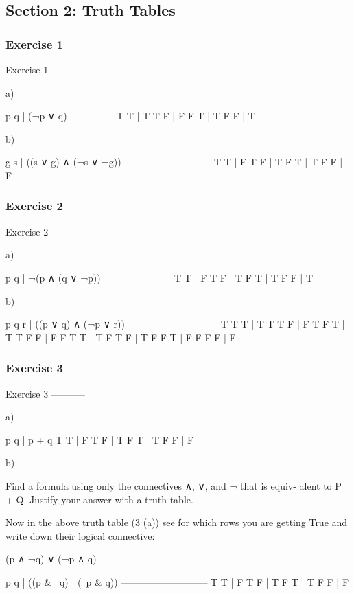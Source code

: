 \subsection{Section 2: Truth Tables}


\subsubsection{Exercise 1}
Exercise 1
-----------

a)


    p q | (¬p ∨ q)
    --------------
    T T | T
    T F | F
    F T | T
    F F | T


b)

    g s | ((s ∨ g) ∧ (¬s ∨ ¬g))
    ---------------------------
    T T | F
    T F | T
    F T | T
    F F | F

\subsubsection{Exercise 2}
Exercise 2
-----------

a)

    p q | ¬(p ∧ (q ∨ ¬p))
    ---------------------
    T T | F
    T F | T
    F T | T
    F F | T

b)

    p q r | ((p ∨ q) ∧ (¬p ∨ r))
    ----------------------------
    T T T | T
    T T F | F
    T F T | T
    T F F | F
    F T T | T
    F T F | T
    F F T | F
    F F F | F

\subsubsection{Exercise 3}
Exercise 3
-----------

a)

    p q | p + q
    T T | F
    T F | T
    F T | T
    F F | F

b)

Find a formula using only the connectives ∧, ∨, and ¬ that is equiv-
alent to P + Q. Justify your answer with a truth table.

Now in the above truth table (3 (a)) see for which rows you are
getting True and write down their logical connective:

    (p ∧ ¬q) ∨ (¬p ∧ q)

    p q | ((p & ~q) | (~p & q))
    ---------------------------
    T T | F
    T F | T
    F T | T
    F F | F

